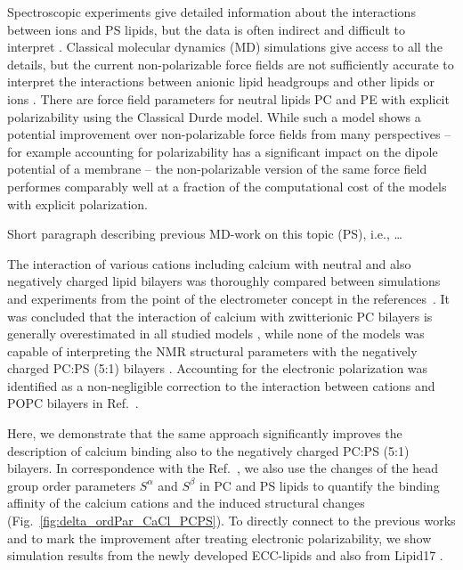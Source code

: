 \documentclass[journal=jpcbfk,manuscript=article]{achemso}
\begin{document}
Spectroscopic experiments give detailed information about the
interactions between ions and PS lipids, but the data is often indirect and difficult to
interpret \cite{hauser77,kurland79,eisenberg79,hauser83,dluhy83,hauser85,feigenson86,mattai89,roux90,roux91,boettcher11}.
Classical molecular dynamics (MD) simulations give
access to all the details, but the current non-polarizable force fields are not
sufficiently accurate to interpret the interactions between anionic
lipid headgroups and other lipids or ions \cite{NMRlipidsIV}.
There are force field parameters for neutral lipids PC and PE 
with explicit polarizability using the Classical Durde model. \cite{chowdhary13, chowdhary17}
While such a model shows a potential improvement over non-polarizable force fields from many perspectives -- 
for example accounting for polarizability has a significant impact on the dipole potential of a membrane \cite{harder2009} -- 
the non-polarizable version of the same force field 
performes comparably well at a fraction of the computational cost 
of the models with explicit polarization. \citep{lucas12,chowdhary13} 

Short paragraph describing previous MD-work on this topic (PS), i.e., \dots 
{}

The interaction of various cations including calcium 
with  neutral and also negatively charged lipid bilayers
was thoroughly compared between simulations and experiments 
from the point of the electrometer concept \cite{roux90, seelig87, altenbach84}
in the references~. 
It was concluded that the interaction of calcium with zwitterionic PC bilayers 
is generally overestimated in all studied models \cite{catte16},
while none of the models was capable of interpreting the NMR structural parameters
with the negatively charged PC:PS (5:1) bilayers \cite{nmrlipids_proj4}. 
Accounting for the electronic polarization was identified as 
a non-negligible correction to the interaction between cations and POPC bilayers in Ref.~\cite{melcr18}. 

Here, we demonstrate that the same approach 
significantly improves the description of calcium binding 
also to the negatively charged PC:PS (5:1) bilayers. 
In correspondence with the Ref.~,
we also use the changes of the head group order parameters $S^\alpha$ and $S^\beta$ 
in PC and PS lipids 
to quantify the binding affinity of the calcium cations
and the induced structural changes
(Fig.~\ref{fig:delta_ordPar_CaCl_PCPS}). 
To directly connect to the previous works \citep{catte16, nmrlipids_proj4}
and to mark the improvement after treating electronic polarizability, 
we show simulation results from the newly developed ECC-lipids and also from Lipid17 \citep{lipid17-future}. 
\end{document}
